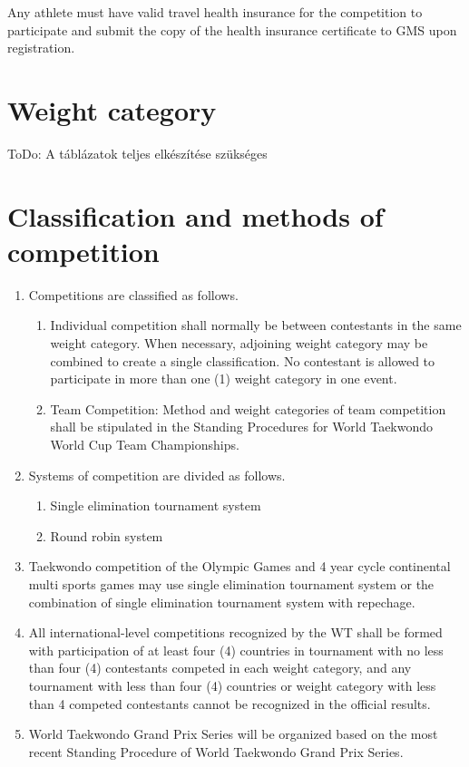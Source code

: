 \documentclass[
]{report}
\begin{document}
Any athlete must have valid travel health insurance for the competition
to participate and submit the copy of the health insurance certificate
to GMS upon registration.

\chapter{Weight category}\label{weight-category}

ToDo: A táblázatok teljes elkészítése szükséges

\chapter{Classification and methods of
competition}\label{classification-and-methods-of-competition}

\begin{enumerate}
\item
  Competitions are classified as follows.

  \begin{enumerate}
  \item
    Individual competition shall normally be between contestants in the
    same weight category. When necessary, adjoining weight category may
    be combined to create a single classification. No contestant is
    allowed to participate in more than one (1) weight category in one
    event.
  \item
    Team Competition: Method and weight categories of team competition
    shall be stipulated in the Standing Procedures for World Taekwondo
    World Cup Team Championships.
  \end{enumerate}
\item
  Systems of competition are divided as follows.

  \begin{enumerate}
  \item
    Single elimination tournament system
  \item
    Round robin system
  \end{enumerate}
\item
  Taekwondo competition of the Olympic Games and 4 year cycle
  continental multi sports games may use single elimination tournament
  system or the combination of single elimination tournament system with
  repechage.
\item
  All international-level competitions recognized by the WT shall be
  formed with participation of at least four (4) countries in tournament
  with no less than four (4) contestants competed in each weight
  category, and any tournament with less than four (4) countries or
  weight category with less than 4 competed contestants cannot be
  recognized in the official results.
\item
  World Taekwondo Grand Prix Series will be organized based on the most
  recent Standing Procedure of World Taekwondo Grand Prix Series.
\end{enumerate}
\end{document}

